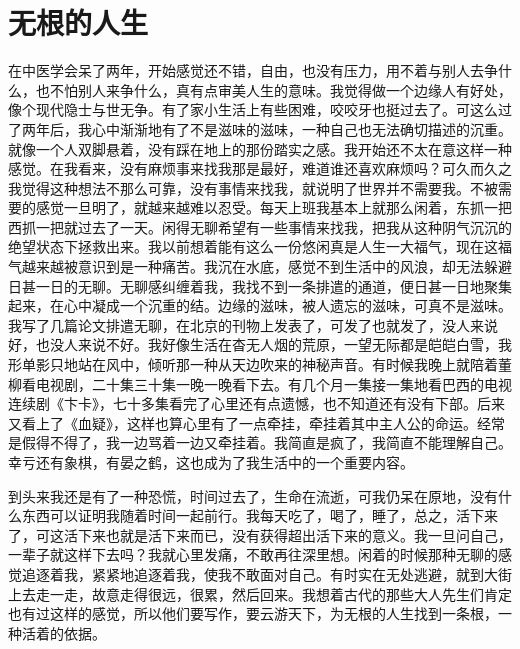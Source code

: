 \documentclass[12pt,oneside]{book}
\begin{document}
\chapter{无根的人生}

在中医学会呆了两年，开始感觉还不错，自由，也没有压力，用不着与别人去争什么，也不怕别人来争什么，真有点审美人生的意味。我觉得做一个边缘人有好处，像个现代隐士与世无争。有了家小生活上有些困难，咬咬牙也挺过去了。可这么过了两年后，我心中渐渐地有了不是滋味的滋味，一种自己也无法确切描述的沉重。就像一个人双脚悬着，没有踩在地上的那份踏实之感。我开始还不太在意这样一种感觉。在我看来，没有麻烦事来找我那是最好，难道谁还喜欢麻烦吗？可久而久之我觉得这种想法不那么可靠，没有事情来找我，就说明了世界并不需要我。不被需要的感觉一旦明了，就越来越难以忍受。每天上班我基本上就那么闲着，东抓一把西抓一把就过去了一天。闲得无聊希望有一些事情来找我，把我从这种阴气沉沉的绝望状态下拯救出来。我以前想着能有这么一份悠闲真是人生一大福气，现在这福气越来越被意识到是一种痛苦。我沉在水底，感觉不到生活中的风浪，却无法躲避日甚一日的无聊。无聊感纠缠着我，我找不到一条排遣的通道，便日甚一日地聚集起来，在心中凝成一个沉重的结。边缘的滋味，被人遗忘的滋味，可真不是滋味。我写了几篇论文排遣无聊，在北京的刊物上发表了，可发了也就发了，没人来说好，也没人来说不好。我好像生活在杳无人烟的荒原，一望无际都是皑皑白雪，我形单影只地站在风中，倾听那一种从天边吹来的神秘声音。有时候我晚上就陪着董柳看电视剧，二十集三十集一晚一晚看下去。有几个月一集接一集地看巴西的电视连续剧《卞卡》，七十多集看完了心里还有点遗憾，也不知道还有没有下部。后来又看上了《血疑》，这样也算心里有了一点牵挂，牵挂着其中主人公的命运。经常是假得不得了，我一边骂着一边又牵挂着。我简直是疯了，我简直不能理解自己。幸亏还有象棋，有晏之鹤，这也成为了我生活中的一个重要内容。

到头来我还是有了一种恐慌，时间过去了，生命在流逝，可我仍呆在原地，没有什么东西可以证明我随着时间一起前行。我每天吃了，喝了，睡了，总之，活下来了，可这活下来也就是活下来而已，没有获得超出活下来的意义。我一旦问自己，一辈子就这样下去吗？我就心里发痛，不敢再往深里想。闲着的时候那种无聊的感觉追逐着我，紧紧地追逐着我，使我不敢面对自己。有时实在无处逃避，就到大街上去走一走，故意走得很远，很累，然后回来。我想着古代的那些大人先生们肯定也有过这样的感觉，所以他们要写作，要云游天下，为无根的人生找到一条根，一种活着的依据。
\end{document}
